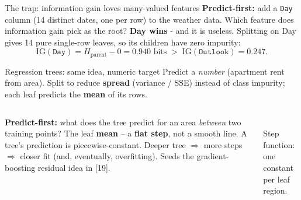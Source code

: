 \documentclass[aspectratio=169]{beamer}
\begin{document}
\begin{frame}{The trap: information gain loves many-valued features}
  \textbf{Predict-first:} add a \texttt{Day} column (14 distinct dates, one per row) to the
  weather data. Which feature does information gain pick as the root?
  \pause
  \vfill
  \textbf{Day wins} - and it is useless. Splitting on Day gives 14 pure single-row leaves, so its
  children have zero impurity:
  \[
    \mathrm{IG}(\texttt{Day}) = H_{\text{parent}} - 0 = 0.940 \text{ bits} \;>\;
    \mathrm{IG}(\texttt{Outlook}) = 0.247.
  \]
  \vfill
\end{frame}

\begin{frame}{Regression trees: same idea, numeric target}
  Predict a \emph{number} (apartment rent from area). Split to reduce \textbf{spread}
  (variance / SSE) instead of class impurity; each leaf predicts the \textbf{mean} of
  its rows.
  \vskip -2pt
  \begin{columns}[T]
    \textbf{Predict-first:} what does the tree predict for an area \emph{between} two
    training points?
    \pause
    \vskip 2pt
    The leaf \textbf{mean} -- a \textbf{flat step}, not a smooth line. A tree's
    prediction is piecewise-constant.
    \vskip 4pt
    \footnotesize Deeper tree $\Rightarrow$ more steps $\Rightarrow$ closer fit (and,
    eventually, overfitting). Seeds the gradient-boosting residual idea in [19].
    \begin{center}
      \\[-2pt]
      \scriptsize Step function: one constant per leaf region.
    \end{center}
  \end{columns}
\end{frame}
\end{document}
